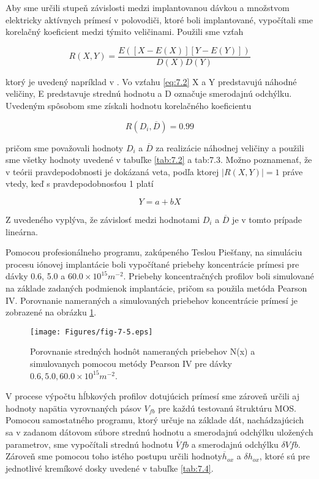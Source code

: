 Aby sme určili stupeň závislosti medzi implantovanou dávkou a
množstvom elektricky aktívnych prímesí v polovodiči, ktoré boli
implantované, vypočítali sme korelačný koeficient medzi týmito
veličinami. Použili sme vzťah

\begin{equation}\label{eq:7.2}
R(X,Y) = \frac{E([X-E(X)][Y-E(Y)])}{D(X)D(Y)}
\end{equation}

ktorý je uvedený napríklad v \cite{7.1}. Vo vzťahu \ref{eq:7.2} X a Y
predstavujú náhodné veličiny, E predstavuje strednú hodnotu a D
označuje smerodajnú odchýlku. Uvedeným spôsobom sme získali hodnotu
korelačného koeficientu

$$R(D_{i}, \overline{D}) = 0.99$$

pričom sme považovali hodnoty $D_{i}$ a $\overline{D}$ za realizácie
náhodnej veličiny a použili sme všetky hodnoty uvedené v tabuľke
\ref{tab:7.2} a {tab:7.3}. Možno poznamenať, že v teórii
pravdepodobnosti je dokázaná veta, podľa ktorej $\rvert R(X,Y)\rvert =
1$ práve vtedy, keď s pravdepodobnosťou 1 platí

$$Y = a + b X$$

Z uvedeného vyplýva, že závislosť medzi hodnotami $D_{i}$ a $\overline
D$ je v tomto prípade lineárna.

Pomocou profesionálneho programu, zakúpeného Teslou Piešťany, na
simuláciu procesu iónovej implantácie boli vypočítané priebehy
koncentrácie prímesi pre dávky 0.6, 5.0 a $60.0 \times 10^{15}
m^{-2}$.  Priebehy koncentračných profilov boli simulované na základe
zadaných podmienok implantácie, pričom sa použila metóda Pearson IV.
Porovnanie nameraných a simulovaných priebehov koncentrácie prímesí je
zobrazené na obrázku \ref{fig:7.5}.

\begin{figure}[h!]\centering
\texttt{[image: Figures/fig-7-5.eps]}
\captionsetup{justification=raggedright, singlelinecheck=false}
{\caption[Porovnanie stredných hodnôt nameraných priebehov N(x) a
    simulovanych pomocou metódy Pearson IV]{Porovnanie stredných
    hodnôt nameraných priebehov N(x) a simulovanych pomocou metódy
    Pearson IV pre dávky $0.6, 5.0, 60.0 \times 10^{15}
    m^{-2}$.}\label{fig:7.5}}
\end{figure}

V procese výpočtu hĺbkových profilov dotujúcich prímesí sme zároveň
určili aj hodnoty napätia vyrovnaných pásov $V_{fb}$ pre každú
testovanú štruktúru MOS. Pomocou samostatného programu, ktorý určuje
na základe dát, nachádzajúcich sa v zadanom dátovom súbore strednú
hodnotu a smerodajnú odchýlku uložených parametrov, sme vypočítali
strednú hodnotu $\overline V{fb}$ a smerodajnú odchýlku $\delta
V{fb}$. Zároveň sme pomocou toho istého postupu určili
hodnoty$\overline h_{ox}$ a $\delta h_{ox}$, ktoré sú pre jednotlivé
kremíkové dosky uvedené v tabuľke \ref{tab:7.4}.

